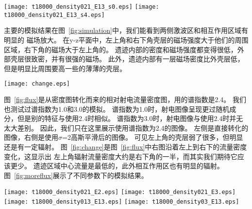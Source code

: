\begin{figure*}
    \centering
    \texttt{[image: t18000\_density021\_E13\_s0.eps]}
    \texttt{[image: t18000\_density021\_E13\_s4.eps]}
    \caption{SNR W51C演化18000年后的相对射电流量密度。右侧图像是$\sigma$=2的高斯平滑结果。
    这里设定距离为4.3 kpc，所以1 pc对应着0.8\am。}
\label{fig:flux}
\end{figure*}

主要的模拟结果在图~\ref{fig:simulation}中，我们能看到两侧激波区和相互作用区域有明显的
磁场放大。
在y-z平面中，左上角和右下角壳层的磁场强度大于他们的周围区域，右下角的磁场大于左上角的。
遗迹内部的密度和磁场强度都变得很低，外部壳层很致密，并有很强的磁场。
此外，遗迹内部有一层磁场密度比外壳层低，但是明显比周围要高一些的薄薄的壳层。

\begin{figure*}
    \centering
    \texttt{[image: change.eps]}
    \caption{这是图~\ref{fig:flux}的右图中左上到右下的流量切线图。 }
\label{fig:change}
\end{figure*}

图~\ref{fig:flux}是从密度图转化而来的相对射电流量密度图，用的谱指数是2.4。
我们也测试过谱指数为1.0和3.0的模拟。
谱指数为1.0时，射电图像呈现更过随机成分，但是别的特征与使用2.4时相似。
谱指数为3.0时，射电图像与使用2.4时并无太大差别。
因此，我们只在这里展示使用谱指数为2.4的图像。
左侧是直接转化的图像，右侧是使用$\sigma$=2高斯平滑后的图像。
可见左上角的壳层弱了很多，但明显还是有一定辐射。
图~\ref{fig:change}是图~\ref{fig:flux}中右图沿着左上到右下的流量密度变化，这显示出
左上角辐射流量密度大约是右下角的一半，而其实我们期待它应该更少。
遗迹区域中心流量是最低的，此外相互作用区也有明显的辐射。
图~\ref{fig:moreflux}展示了不同参数下的模拟结果。

\begin{figure*}
    \centering
    \texttt{[image: t18000\_density021\_E2.eps]}
    \texttt{[image: t18000\_density021\_E3.eps]}\newline
    \texttt{[image: t18000\_density013\_E13.eps]}
    \texttt{[image: t18000\_density03\_E13.eps]}
    \caption{这是$\sigma$=2时不同参数下的相对射电流量密度图。 顶部两幅图为将初始爆发动能改为
    2.0和3.0 $\times$ 10$^{51}$ ergs的结果, 下面两幅图为将平均介质密度改为
    0.13 cm$^{-3}$和0.3 cm$^{-3}$的结果。}
\label{fig:moreflux}
\end{figure*}


